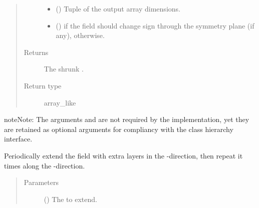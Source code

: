 \documentclass[letterpaper,10pt,english]{sphinxmanual}
\begin{document}
\begin{fulllineitems}
\begin{fulllineitems}
\begin{quote}
\begin{description}
\begin{itemize}
\item {} 
 () \textendash{} Tuple of the output array dimensions.

\item {} 
 () \textendash{}  if the field should change sign through the symmetry plane (if any),  otherwise.

\end{itemize}

\item[{Returns}] \leavevmode
The shrunk .

\item[{Return type}] \leavevmode
array\_like

\end{description}\end{quote}

\begin{sphinxadmonition}{note}{Note:}
The arguments  and  are not required by the implementation,
yet they are retained as optional arguments for compliancy with the class hierarchy interface.
\end{sphinxadmonition}

\end{fulllineitems}


\begin{fulllineitems}
\label{\detokenize{api:dycore.horizontal_boundary.PeriodicYZ.from_physical_to_computational_domain}}
Periodically extend the field  with  extra layers in the -direction,
then repeat it  times along the -direction.
\begin{quote}\begin{description}
\item[{Parameters}] \leavevmode
{} () \textendash{} The  to extend.


\end{description}
\end{quote}
\end{fulllineitems}
\end{fulllineitems}
\end{document}
